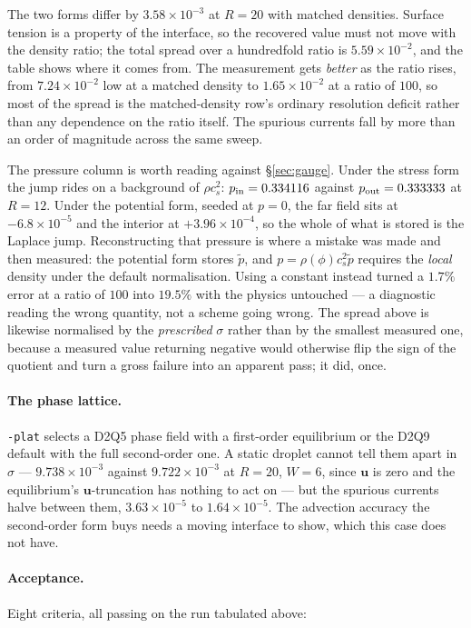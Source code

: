 \documentclass[11pt,a4paper]{article}
\newcommand{\code}[1]{\texttt{\small #1}}
\newcommand{\cs}{c_s}
\newcommand{\uu}{\bm{u}}
\newcommand{\e}[1]{\times 10^{#1}}
\begin{document}
\noindent The two forms differ by $3.58\e{-3}$ at $R=20$ with matched densities.
Surface tension is a property of the interface, so the recovered value must not
move with the density ratio; the total spread over a hundredfold ratio is
$5.59\e{-2}$, and the table shows where it comes from. The measurement gets
\emph{better} as the ratio rises, from $7.24\e{-2}$ low at a matched density to
$1.65\e{-2}$ at a ratio of $100$, so most of the spread is the matched-density
row's ordinary resolution deficit rather than any dependence on the ratio itself.
The spurious currents fall by more than an order of magnitude across the same
sweep.

The pressure column is worth reading against \S\ref{sec:gauge}. Under the stress
form the jump rides on a background of $\rho\cs^2$: $p_{\rm in}=0.334116$ against
$p_{\rm out}=0.333333$ at $R=12$. Under the potential form, seeded at $p=0$, the
far field sits at $-6.8\e{-5}$ and the interior at $+3.96\e{-4}$, so the whole of
what is stored is the Laplace jump. Reconstructing that pressure is where a
mistake was made and then measured: the potential form stores $\tilde{p}$, and
$p = \rho(\phi)\cs^2\tilde{p}$ requires the \emph{local} density under the default
normalisation. Using a constant instead turned a $1.7\%$ error at a ratio of $100$
into $19.5\%$ with the physics untouched --- a diagnostic reading the wrong
quantity, not a scheme going wrong. The spread above is likewise normalised by
the \emph{prescribed} $\sigma$ rather than by the smallest measured one, because a
measured value returning negative would otherwise flip the sign of the quotient
and turn a gross failure into an apparent pass; it did, once.

\paragraph{The phase lattice.} \code{-plat} selects a D2Q5 phase field with a
first-order equilibrium or the D2Q9 default with the full second-order one. A
static droplet cannot tell them apart in $\sigma$ --- $9.738\e{-3}$ against
$9.722\e{-3}$ at $R=20$, $W=6$, since $\uu$ is zero and the equilibrium's
$\uu$-truncation has nothing to act on --- but the spurious currents halve
between them, $3.63\e{-5}$ to $1.64\e{-5}$. The advection accuracy the
second-order form buys needs a moving interface to show, which this case does not
have.

\paragraph{Acceptance.} Eight criteria, all passing on the run tabulated above:
\end{document}
